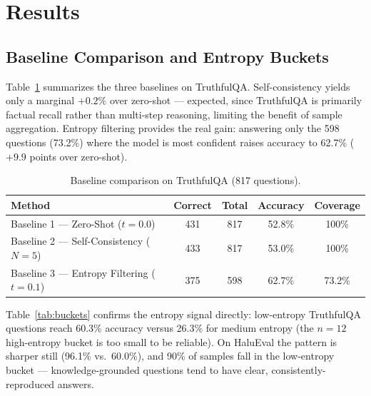 \documentclass{llncs}
\begin{document}
\FloatBarrier

\section{Results}
\label{sec:results}

\subsection{Baseline Comparison and Entropy Buckets}

Table~\ref{tab:baselines} summarizes the three baselines on TruthfulQA.
Self-consistency yields only a marginal $+0.2\%$ over zero-shot — expected,
since TruthfulQA is primarily factual recall rather than multi-step reasoning,
limiting the benefit of sample aggregation. Entropy filtering provides the
real gain: answering only the 598 questions (73.2\%) where the model is most
confident raises accuracy to 62.7\% ($+9.9$ points over zero-shot).

\begin{table}[h]
\centering
\caption{Baseline comparison on TruthfulQA (817 questions).}
\label{tab:baselines}
\begin{tabular}{lcccc}
\toprule
\textbf{Method} & \textbf{Correct} & \textbf{Total} & \textbf{Accuracy} & \textbf{Coverage} \\
\midrule
Baseline 1 — Zero-Shot ($t{=}0.0$)         & 431 & 817 & 52.8\% & 100\%  \\
Baseline 2 — Self-Consistency ($N{=}5$)    & 433 & 817 & 53.0\% & 100\%  \\
Baseline 3 — Entropy Filtering ($t{=}0.1$) & 375 & 598 & 62.7\% & 73.2\% \\
\bottomrule
\end{tabular}
\end{table}

Table~\ref{tab:buckets} confirms the entropy signal directly: low-entropy
TruthfulQA questions reach 60.3\% accuracy versus 26.3\% for medium entropy
(the $n{=}12$ high-entropy bucket is too small to be reliable). On HaluEval
the pattern is sharper still (96.1\% vs.\ 60.0\%), and 90\% of samples fall in
the low-entropy bucket — knowledge-grounded questions tend to have clear,
consistently-reproduced answers.
\end{document}
